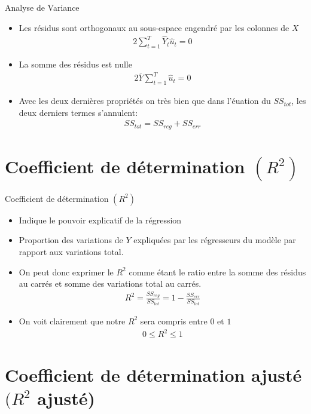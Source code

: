 \documentclass{beamer}
\begin{document}
\begin{frame}{Analyse de Variance}
\begin{itemize}
\item Les résidus sont orthogonaux au sous-espace engendré par les colonnes de $X$ 
\begin{align*}
2\sum_{t=1}^T \hat{Y}_t \hat{u}_t=0
\end{align*}
\item La somme des résidus est nulle
\begin{align*}
2 \overline{Y} \sum_{t=1}^T \hat{u}_t=0
\end{align*}
\item Avec les deux dernières propriétés on très bien que dans l'éuation du $SS_{tot}$, les deux derniers termes s’annulent:
\begin{align*}
SS_{tot}=SS_{reg}+SS_{err}
\end{align*}
\end{itemize}
\end{frame}

\section{Coefficient de détermination $(R^2)$}

\frame{\tableofcontents[current]}

\begin{frame}{Coefficient de détermination $(R^2)$}
\begin{itemize}
\item Indique le pouvoir explicatif de la régression
\item Proportion des variations de $Y$ expliquées par les régresseurs du modèle par rapport aux variations total.
\item On peut donc exprimer le $R^2$ comme étant le ratio entre la somme des résidus au carrés et somme des variations total au carrés. 
\begin{align*}
R^2=\frac{SS_{reg}}{SS_{tot}}=1-\frac{SS_{err}}{SS_{tot}}
\end{align*}
\item On voit clairement que notre $R^2$ sera compris entre $0$ et $1$
\begin{align*}
0 \le R^2 \le 1
\end{align*}
\end{itemize}
\end{frame}


\section{Coefficient de détermination ajusté $(R^2$ ajusté)}
\end{document}
